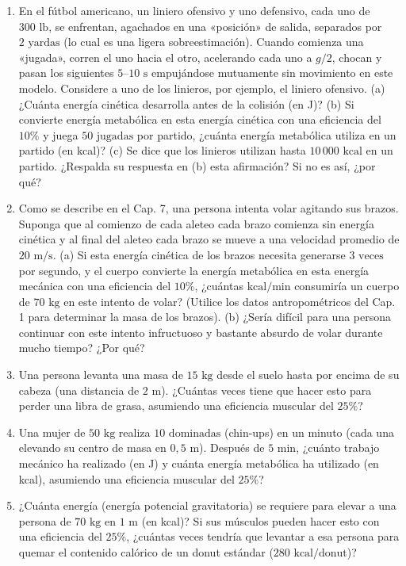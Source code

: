 \documentclass[12pt]{book}
\begin{document}
\begin{enumerate}
\item[6.73] En el fútbol americano, un liniero ofensivo y uno defensivo, cada uno de $300\text{ lb}$, se enfrentan, agachados en una «posición» de salida, separados por $2\text{ yardas}$ (lo cual es una ligera sobreestimación). Cuando comienza una «jugada», corren el uno hacia el otro, acelerando cada uno a $g/2$, chocan y pasan los siguientes $5\text{--}10\text{ s}$ empujándose mutuamente sin movimiento en este modelo. Considere a uno de los linieros, por ejemplo, el liniero ofensivo. (a) ¿Cuánta energía cinética desarrolla antes de la colisión (en J)? (b) Si convierte energía metabólica en esta energía cinética con una eficiencia del $10\%$ y juega $50\text{ jugadas}$ por partido, ¿cuánta energía metabólica utiliza en un partido (en kcal)? (c) Se dice que los linieros utilizan hasta $10\,000\text{ kcal}$ en un partido. ¿Respalda su respuesta en (b) esta afirmación? Si no es así, ¿por qué?

\item[6.74] Como se describe en el Cap. 7, una persona intenta volar agitando sus brazos. Suponga que al comienzo de cada aleteo cada brazo comienza sin energía cinética y al final del aleteo cada brazo se mueve a una velocidad promedio de $20\text{ m/s}$. (a) Si esta energía cinética de los brazos necesita generarse $3\text{ veces}$ por segundo, y el cuerpo convierte la energía metabólica en esta energía mecánica con una eficiencia del $10\%$, ¿cuántas $\text{kcal/min}$ consumiría un cuerpo de $70\text{ kg}$ en este intento de volar? (Utilice los datos antropométricos del Cap. 1 para determinar la masa de los brazos). (b) ¿Sería difícil para una persona continuar con este intento infructuoso y bastante absurdo de volar durante mucho tiempo? ¿Por qué?

\item[6.75] Una persona levanta una masa de $15\text{ kg}$ desde el suelo hasta por encima de su cabeza (una distancia de $2\text{ m}$). ¿Cuántas veces tiene que hacer esto para perder una libra de grasa, asumiendo una eficiencia muscular del $25\%$?

\item[6.76] Una mujer de $50\text{ kg}$ realiza $10\text{ dominadas}$ (chin-ups) en un minuto (cada una elevando su centro de masa en $0{,}5\text{ m}$). Después de $5\text{ min}$, ¿cuánto trabajo mecánico ha realizado (en J) y cuánta energía metabólica ha utilizado (en kcal), asumiendo una eficiencia muscular del $25\%$?

\item[6.77] ¿Cuánta energía (energía potencial gravitatoria) se requiere para elevar a una persona de $70\text{ kg}$ en $1\text{ m}$ (en kcal)? Si sus músculos pueden hacer esto con una eficiencia del $25\%$, ¿cuántas veces tendría que levantar a esa persona para quemar el contenido calórico de un donut estándar ($280\text{ kcal/donut}$)?


\end{enumerate}
\end{document}

